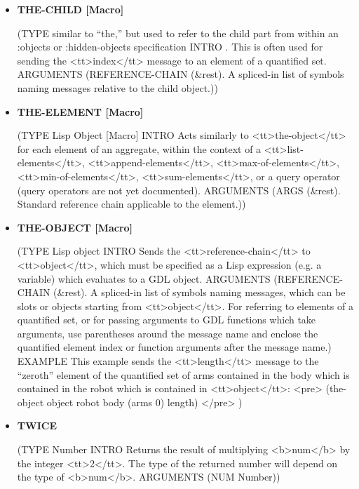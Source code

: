 \documentclass [11pt]{book}
\begin{document}
\begin{itemize}
\item {}
\label{prim:the-child}
\textbf{THE-CHILD [Macro]}

(TYPE similar to ``the,'' but used to refer to the child part from within an :objects or :hidden-objects specification INTRO .
This is often used for sending the <tt>index</tt> message to an element of a quantified set.
 ARGUMENTS (REFERENCE-CHAIN (\&rest). A spliced-in list of symbols naming messages relative to the child object.))



\item {}
\label{prim:the-element}
\textbf{THE-ELEMENT [Macro]}

(TYPE Lisp Object [Macro] INTRO  Acts similarly to <tt>the-object</tt> for each element of an aggregate,
within the context of a <tt>list-elements</tt>, <tt>append-elements</tt>, <tt>max-of-elements</tt>,
<tt>min-of-elements</tt>, <tt>sum-elements</tt>, or a query operator (query operators are not
yet documented).
 ARGUMENTS (ARGS (\&rest). Standard reference chain applicable to the element.))



\item {}
\label{prim:the-object}
\textbf{THE-OBJECT [Macro]}

(TYPE Lisp object INTRO  Sends the <tt>reference-chain</tt> to <tt>object</tt>, which must be specified
as a Lisp expression (e.g. a variable) which evaluates to a GDL object.
 ARGUMENTS (REFERENCE-CHAIN (\&rest). A spliced-in list of symbols naming messages, which can 
be slots or objects starting from <tt>object</tt>. For referring to elements of a quantified set,
or for passing arguments to GDL functions which take arguments, use parentheses around the
message name and enclose the quantified element index or function arguments after the message
name.) EXAMPLE 
This example sends the <tt>length</tt> message to the ``zeroth'' element of the quantified
set of arms contained in the body which is contained in the robot which is contained in <tt>object</tt>:
<pre>
 (the-object object robot body (arms 0) length)
</pre>
)



\item {}
\label{prim:twice}
\textbf{TWICE}

(TYPE Number INTRO  Returns the result of multiplying <b>num</b> by the integer <tt>2</tt>.
The type of the returned number will depend on the type of <b>num</b>.
 ARGUMENTS (NUM Number))




\end{itemize}
\end{document}
